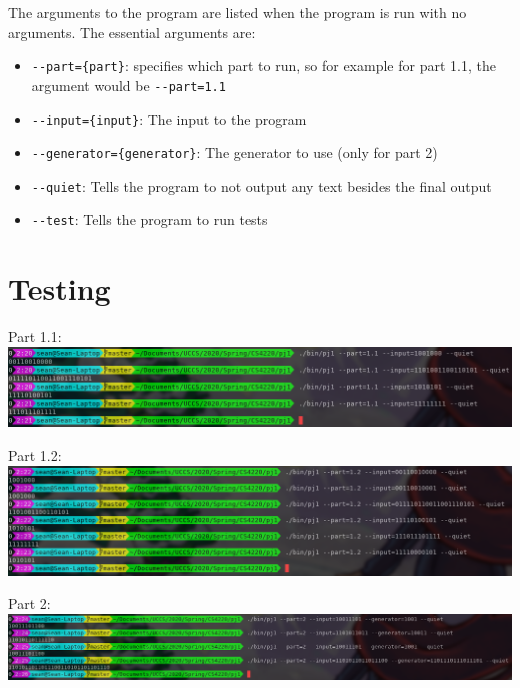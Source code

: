 \documentclass[12pt]{article}
\begin{document}
    The arguments to the program are listed when the program is run with no arguments. The essential arguments are:

    \begin{itemize}
        \item \verb|--part={part}|: specifies which part to run, so for example for part 1.1, the argument would be \verb|--part=1.1|
        \item \verb|--input={input}|: The input to the program
        \item \verb|--generator={generator}|: The generator to use (only for part 2)
        \item \verb|--quiet|: Tells the program to not output any text besides the final output
        \item \verb|--test|: Tells the program to run tests
    \end{itemize}

    \section*{Testing}

    Part 1.1:
    \includegraphics[width=\textwidth]{Tests-Part-1-1}

    Part 1.2:
    \includegraphics[width=\textwidth]{Tests-Part-1-2}

    Part 2:
    \includegraphics[width=\textwidth]{Tests-Part-2}
\end{document}
